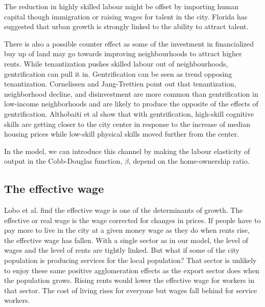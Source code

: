 The reduction in highly skilled labour might be offset by importing human capital though immigration or raising wages for talent in the city. Florida\cite{floridaCompetingAgeTalent2005, floridaCreativeClassEconomic2014} has suggested that urban growth is strongly linked to the ability to attract talent. 


There is also a possible counter effect as some of the investment in financialized buy up of land may go towards improving neighbourhoods to attract higher rents.  
While tenantization pushes skilled labour out of neighbourhoods, gentrification can pull it in. Gentrification can be seen as trend opposing tenantization. Cornelissen and Jang-Trettien \cite{cornelissenHousingContextNeighborhood2023} point out that tenantization, neighborhood decline, and disinvestment are more common than gentrification in low-income neighborhoods and are likely to produce the opposite of the effects of gentrification. Althobaiti et al \cite{althobaitiHousingPricesSkills2021a} %
show that with gentrification, high-skill cognitive skills are getting closer to the city center in response to the increase of median housing prices while low-skill physical skills moved further from the center.  

In the model, we can introduce this channel by making the labour elasticity of output in the Cobb-Douglas function, $\beta$, depend on the home-ownership ratio.  

\subsection{The effective wage}
 Lobo et al. \cite{loboUrbanScalingProduction2013} find the effective wage is one of the determinants of growth. The effective or real wage is the wage corrected for changes in prices. If people have to pay more to live in the city at a given money wage as they do when rents rise, the effective wage has fallen. With a single sector as in our model, the level of wages and the level of rents are tightly linked. But what if some of the city population is producing services for the local population? That sector is unlikely to enjoy these same positive agglomeration effects as the export sector does when the population grows. Rising rents would lower the effective wage for workers in that sector. The cost of living rises for everyone but wages fall behind for service workers.  %

